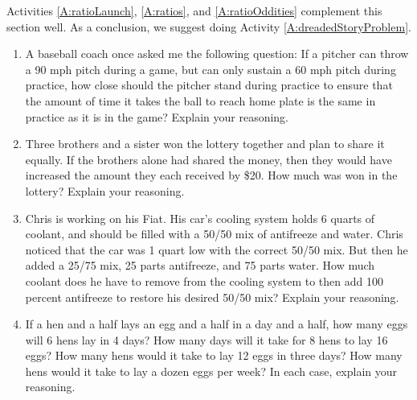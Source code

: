 \begin{activitynote}
Activities \ref{A:ratioLaunch}, \ref{A:ratios},  and \ref{A:ratioOddities} complement this section well. 
As a conclusion, we suggest doing Activity \ref{A:dreadedStoryProblem}.
\end{activitynote}

\newpage
\begin{problems}


\begin{enumerate}
\item A baseball coach once asked me the following question: If a
  pitcher can throw a 90 mph pitch during a game, but can only
  sustain a 60 mph pitch during practice, how close should the pitcher
  stand during practice to ensure that the amount of time it takes the
  ball to reach home plate is the same in practice as it is in the
  game? Explain your reasoning.

\item Three brothers and a sister won the lottery together and plan to
  share it equally. If the brothers alone had shared the money, then
  they would have increased the amount they each received by \$20. How
  much was won in the lottery? Explain your reasoning.

\item Chris is working on his Fiat. His car's cooling system holds 6
  quarts of coolant, and should be filled with a 50/50 mix of antifreeze 
and water. Chris noticed that the car was 1 quart low with the correct 50/50 mix.  
But then he added a 25/75 mix, 25 parts antifreeze, and 75 parts water.  How
  much coolant does he have to remove from the cooling system to then
  add 100 percent antifreeze to restore his desired 50/50 mix? Explain
  your reasoning.

\item If a hen and a half lays an egg and a half in a day and a half, 
how many eggs will 6 hens lay in 4 days?  How many days will it take for 
8 hens to lay 16 eggs?  How many hens would it take to lay 12 eggs in 
three days?  How many hens would it take to lay a dozen eggs per week?  
In each case, explain your reasoning.  


\end{enumerate}
\end{problems}
